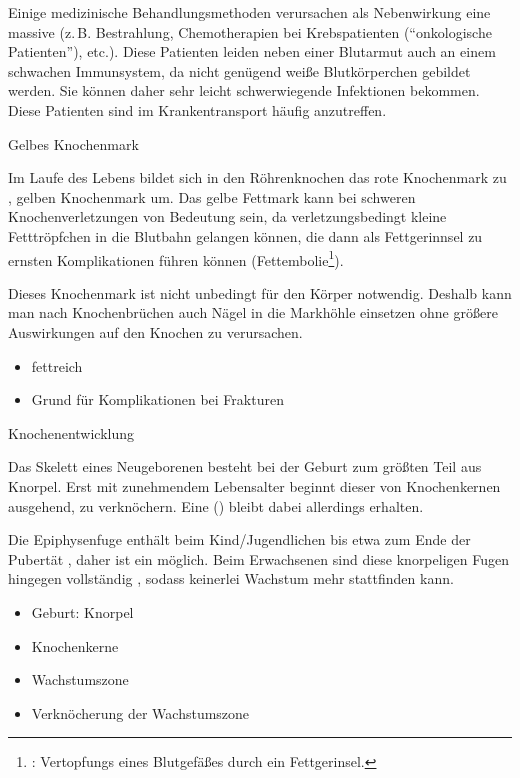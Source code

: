 Einige medizinische Behandlungsmethoden verursachen als
Nebenwirkung eine massive  (z.\,B.
Bestrahlung, Chemotherapien bei Krebspatienten
(\protect\enquote{onkologische Patienten}), etc.). Diese
Patienten leiden neben einer Blutarmut auch an einem
schwachen Immunsystem, da nicht genügend weiße
Blutkörperchen gebildet werden. Sie können daher sehr leicht
schwerwiegende Infektionen bekommen.
Diese Patienten sind im Krankentransport häufig anzutreffen.



{Gelbes Knochenmark}
{%
Im Laufe des Lebens bildet sich in den
Röhrenknochen das rote Knochenmark  zu ,
gelben Knochenmark um.
Das gelbe Fettmark kann bei schweren Knochenverletzungen von Bedeutung
sein, da verletzungs\-bedingt kleine Fetttröpfchen in die
Blutbahn gelangen können, die dann als Fettgerinnsel zu ernsten
Komplikationen führen können
(Fettembolie\footnote{:
Vertopfungs eines Blutgefäßes durch ein Fettgerinsel.}).

Dieses Knochenmark ist nicht unbedingt für den Körper
notwendig. Deshalb kann man nach Knochenbrüchen auch Nägel in die
Markhöhle einsetzen ohne größere Auswirkungen auf den
Knochen zu verursachen.
%
}
{%
\begin{itemize}
  \item fettreich
  \item Grund für Komplikationen bei Frakturen
\end{itemize}
}
{}{}{}


{Knochenentwicklung}
{%
Das Skelett eines Neugeborenen besteht bei der Geburt zum
größten Teil aus Knorpel. Erst mit zunehmendem Lebensalter
beginnt dieser von Knochenkernen ausgehend, zu verknöchern.
Eine
() bleibt dabei allerdings erhalten.

Die Epiphysenfuge enthält beim Kind/Jugendlichen bis etwa
zum Ende der Pubertät ,
daher ist ein  möglich. Beim Erwachsenen
sind diese knorpeligen Fugen hingegen vollständig
, sodass keinerlei Wachstum mehr stattfinden
kann.
}
{%
\begin{itemize}
  \item Geburt: Knorpel
  \item Knochenkerne
  \item Wachstumszone
  \item Verknöcherung der Wachstumszone
\end{itemize}
}
{}{}{}

